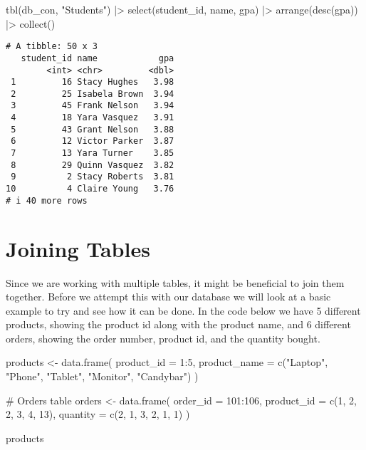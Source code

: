 \documentclass[
  letterpaper,
  DIV=11,
  numbers=noendperiod]{scrreprt}
\newenvironment{Shaded}{\begin{snugshade}}{\end{snugshade}}
\newcommand{\AttributeTok}[1]{\textcolor[rgb]{0.40,0.45,0.13}{#1}}
\newcommand{\CommentTok}[1]{\textcolor[rgb]{0.37,0.37,0.37}{#1}}
\newcommand{\DecValTok}[1]{\textcolor[rgb]{0.68,0.00,0.00}{#1}}
\newcommand{\FunctionTok}[1]{\textcolor[rgb]{0.28,0.35,0.67}{#1}}
\newcommand{\NormalTok}[1]{\textcolor[rgb]{0.00,0.23,0.31}{#1}}
\newcommand{\OtherTok}[1]{\textcolor[rgb]{0.00,0.23,0.31}{#1}}
\newcommand{\SpecialCharTok}[1]{\textcolor[rgb]{0.37,0.37,0.37}{#1}}
\newcommand{\StringTok}[1]{\textcolor[rgb]{0.13,0.47,0.30}{#1}}
\begin{document}
\begin{Shaded}
\begin{Highlighting}[]
\FunctionTok{tbl}\NormalTok{(db\_con, }\StringTok{"Students"}\NormalTok{) }\SpecialCharTok{|\textgreater{}} \FunctionTok{select}\NormalTok{(student\_id, name, gpa) }\SpecialCharTok{|\textgreater{}} 
        \FunctionTok{arrange}\NormalTok{(}\FunctionTok{desc}\NormalTok{(gpa)) }\SpecialCharTok{|\textgreater{}} 
        \FunctionTok{collect}\NormalTok{()}
\end{Highlighting}
\end{Shaded}

\begin{verbatim}
# A tibble: 50 x 3
   student_id name            gpa
        <int> <chr>         <dbl>
 1         16 Stacy Hughes   3.98
 2         25 Isabela Brown  3.94
 3         45 Frank Nelson   3.94
 4         18 Yara Vasquez   3.91
 5         43 Grant Nelson   3.88
 6         12 Victor Parker  3.87
 7         13 Yara Turner    3.85
 8         29 Quinn Vasquez  3.82
 9          2 Stacy Roberts  3.81
10          4 Claire Young   3.76
# i 40 more rows
\end{verbatim}

\section{Joining Tables}\label{joining-tables}

Since we are working with multiple tables, it might be beneficial to
join them together. Before we attempt this with our database we will
look at a basic example to try and see how it can be done. In the code
below we have 5 different products, showing the product id along with
the product name, and 6 different orders, showing the order number,
product id, and the quantity bought.

\begin{Shaded}
\begin{Highlighting}[]
\NormalTok{products }\OtherTok{\textless{}{-}} \FunctionTok{data.frame}\NormalTok{(}
  \AttributeTok{product\_id =} \DecValTok{1}\SpecialCharTok{:}\DecValTok{5}\NormalTok{,}
  \AttributeTok{product\_name =} \FunctionTok{c}\NormalTok{(}\StringTok{"Laptop"}\NormalTok{, }\StringTok{"Phone"}\NormalTok{, }\StringTok{"Tablet"}\NormalTok{, }\StringTok{"Monitor"}\NormalTok{, }\StringTok{"Candybar"}\NormalTok{)}
\NormalTok{)}

\CommentTok{\# Orders table}
\NormalTok{orders }\OtherTok{\textless{}{-}} \FunctionTok{data.frame}\NormalTok{(}
  \AttributeTok{order\_id =} \DecValTok{101}\SpecialCharTok{:}\DecValTok{106}\NormalTok{,}
  \AttributeTok{product\_id =} \FunctionTok{c}\NormalTok{(}\DecValTok{1}\NormalTok{, }\DecValTok{2}\NormalTok{, }\DecValTok{2}\NormalTok{, }\DecValTok{3}\NormalTok{, }\DecValTok{4}\NormalTok{, }\DecValTok{13}\NormalTok{),}
  \AttributeTok{quantity =} \FunctionTok{c}\NormalTok{(}\DecValTok{2}\NormalTok{, }\DecValTok{1}\NormalTok{, }\DecValTok{3}\NormalTok{, }\DecValTok{2}\NormalTok{, }\DecValTok{1}\NormalTok{, }\DecValTok{1}\NormalTok{)}
\NormalTok{)}

\NormalTok{products}
\end{Highlighting}
\end{Shaded}
\end{document}
